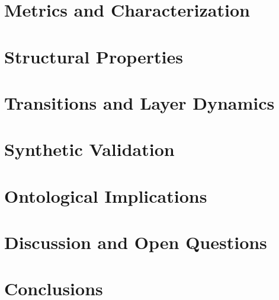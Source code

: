 \documentclass[11pt,a4paper]{article}
\begin{document}
\section{Metrics and Characterization}


\section{Structural Properties}


\section{Transitions and Layer Dynamics}


\section{Synthetic Validation}


\section{Ontological Implications}


\section{Discussion and Open Questions}


\section{Conclusions}


\nocite{*}


\end{document}
